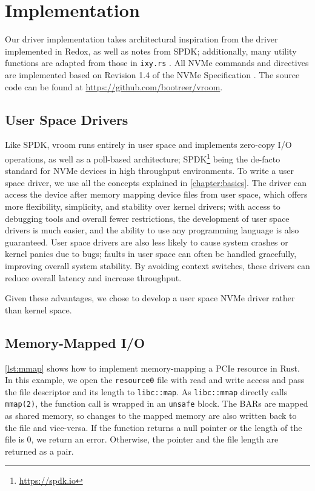 \chapter{Implementation}\label{chapter:implementation}
Our driver implementation takes architectural inspiration from the driver implemented in Redox, as well as notes from SPDK; additionally, many utility functions are adapted from those in \texttt{ixy.rs} \cite{ixy.rs}. All NVMe commands and directives are implemented based on Revision 1.4 of the NVMe Specification \cite{nvme-spec}. The source code can be found at \url{https://github.com/bootreer/vroom}.

\section{User Space Drivers}
Like SPDK, vroom runs entirely in user space and implements zero-copy I/O operations, as well as a poll-based architecture; SPDK\footnote{\url{https://spdk.io}} being the de-facto standard for NVMe devices in high throughput environments. To write a user space driver, we use all the concepts explained in \autoref{chapter:basics}. The driver can access the device after memory mapping device files from user space, which offers more flexibility, simplicity, and stability over kernel drivers; with access to debugging tools and overall fewer restrictions, the development of user space drivers is much easier, and the ability to use any programming language is also guaranteed. User space drivers are also less likely to cause system crashes or kernel panics due to bugs; faults in user space can often be handled gracefully, improving overall system stability. By avoiding context switches, these drivers can reduce overall latency and increase throughput.

Given these advantages, we chose to develop a user space NVMe driver rather than kernel space.

\section{Memory-Mapped I/O}\label{section:MMIO}

\autoref{lst:mmap} shows how to implement memory-mapping a PCIe resource in Rust. In this example, we open the \texttt{resource0} file with read and write access and pass the file descriptor and its length to \texttt{libc::map}. As \texttt{libc::mmap} directly calls \texttt{mmap(2)}, the function call is wrapped in an \texttt{unsafe} block. The BARs are mapped as shared memory, so changes to the mapped memory are also written back to the file and vice-versa. If the function returns a null pointer or the length of the file is 0, we return an error. Otherwise, the pointer and the file length are returned as a pair.

